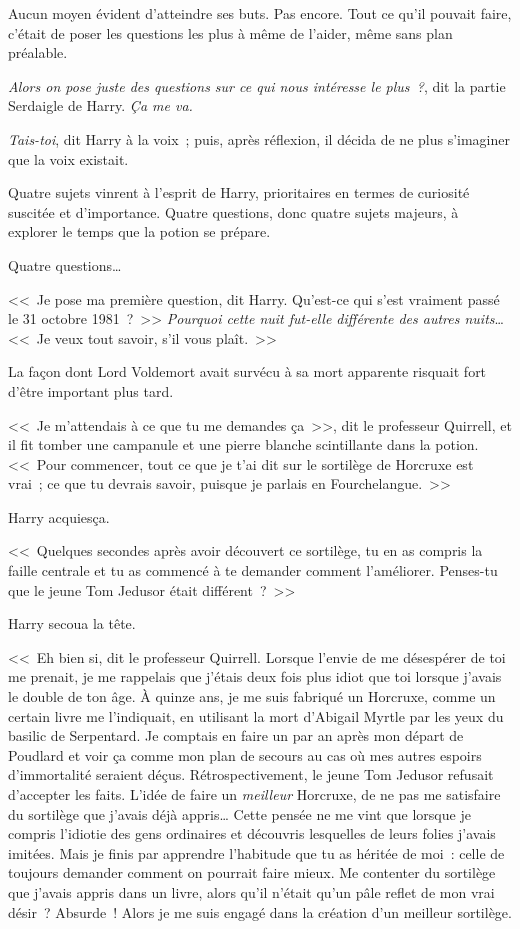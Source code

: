 Aucun moyen évident d'atteindre ses buts. Pas encore. Tout ce qu'il pouvait faire, c'était de poser les questions les plus à même de l'aider, même sans plan préalable.

\emph{Alors on pose juste des questions sur ce qui nous intéresse le plus~?}, dit la partie Serdaigle de Harry. \emph{Ça me va.}

\emph{Tais-toi}, dit Harry à la voix~; puis, après réflexion, il décida de ne plus s'imaginer que la voix existait.

Quatre sujets vinrent à l'esprit de Harry, prioritaires en termes de curiosité suscitée et d'importance. Quatre questions, donc quatre sujets majeurs, à explorer le temps que la potion se prépare.

Quatre questions…

<<~Je pose ma première question, dit Harry. Qu'est-ce qui s'est vraiment passé le 31 octobre 1981~?~>> \emph{Pourquoi cette nuit fut-elle différente des autres nuits}… <<~Je veux tout savoir, s'il vous plaît.~>>

La façon dont Lord Voldemort avait survécu à sa mort apparente risquait fort d'être important plus tard.

<<~Je m'attendais à ce que tu me demandes ça~>>, dit le professeur Quirrell, et il fit tomber une campanule et une pierre blanche scintillante dans la potion. <<~Pour commencer, tout ce que je t'ai dit sur le sortilège de Horcruxe est vrai~; ce que tu devrais savoir, puisque je parlais en Fourchelangue.~>>

Harry acquiesça.

<<~Quelques secondes après avoir découvert ce sortilège, tu en as compris la faille centrale et tu as commencé à te demander comment l'améliorer. Penses-tu que le jeune Tom Jedusor était différent~?~>>

Harry secoua la tête.

<<~Eh bien si, dit le professeur Quirrell. Lorsque l'envie de me désespérer de toi me prenait, je me rappelais que j'étais deux fois plus idiot que toi lorsque j'avais le double de ton âge. À quinze ans, je me suis fabriqué un Horcruxe, comme un certain livre me l'indiquait, en utilisant la mort d'Abigail Myrtle par les yeux du basilic de Serpentard. Je comptais en faire un par an après mon départ de Poudlard et voir ça comme mon plan de secours au cas où mes autres espoirs d'immortalité seraient déçus. Rétrospectivement, le jeune Tom Jedusor refusait d'accepter les faits. L'idée de faire un \emph{meilleur} Horcruxe, de ne pas me satisfaire du sortilège que j'avais déjà appris… Cette pensée ne me vint que lorsque je compris l'idiotie des gens ordinaires et découvris lesquelles de leurs folies j'avais imitées. Mais je finis par apprendre l'habitude que tu as héritée de moi~: celle de toujours demander comment on pourrait faire mieux. Me contenter du sortilège que j'avais appris dans un livre, alors qu'il n'était qu'un pâle reflet de mon vrai désir~? Absurde~! Alors je me suis engagé dans la création d'un meilleur sortilège.

